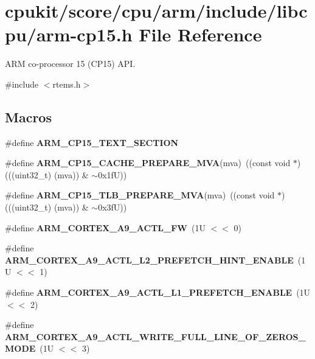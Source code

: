 \hypertarget{arm-cp15_8h}{}\section{cpukit/score/cpu/arm/include/libcpu/arm-\/cp15.h File Reference}
\label{arm-cp15_8h}


A\+RM co-\/processor 15 (C\+P15) A\+PI.  


{\ttfamily \#include $<$rtems.\+h$>$}\newline
\subsection*{Macros}
\begin{DoxyCompactItemize}
\item 
\mbox{\label{arm-cp15_8h_a0c4c710cc0f6b1bfbdc26505bc53a447}} 
\#define {\bfseries A\+R\+M\+\_\+\+C\+P15\+\_\+\+T\+E\+X\+T\+\_\+\+S\+E\+C\+T\+I\+ON}
\item 
\mbox{\label{arm-cp15_8h_ab15a778a34f0fd55e4ed88f792a86b35}} 
\#define {\bfseries A\+R\+M\+\_\+\+C\+P15\+\_\+\+C\+A\+C\+H\+E\+\_\+\+P\+R\+E\+P\+A\+R\+E\+\_\+\+M\+VA}(mva)~((const void $\ast$) (((uint32\+\_\+t) (mva)) \& $\sim$0x1f\+U))
\item 
\mbox{\label{arm-cp15_8h_aefc5be3f674b2fa5b636a62ad2952a64}} 
\#define {\bfseries A\+R\+M\+\_\+\+C\+P15\+\_\+\+T\+L\+B\+\_\+\+P\+R\+E\+P\+A\+R\+E\+\_\+\+M\+VA}(mva)~((const void $\ast$) (((uint32\+\_\+t) (mva)) \& $\sim$0x3f\+U))
\item 
\#define {\bfseries A\+R\+M\+\_\+\+C\+O\+R\+T\+E\+X\+\_\+\+A9\+\_\+\+A\+C\+T\+L\+\_\+\+FW}~(1\+U $<$$<$ 0)
\item 
\#define {\bfseries A\+R\+M\+\_\+\+C\+O\+R\+T\+E\+X\+\_\+\+A9\+\_\+\+A\+C\+T\+L\+\_\+\+L2\+\_\+\+P\+R\+E\+F\+E\+T\+C\+H\+\_\+\+H\+I\+N\+T\+\_\+\+E\+N\+A\+B\+LE}~(1\+U $<$$<$ 1)
\item 
\#define {\bfseries A\+R\+M\+\_\+\+C\+O\+R\+T\+E\+X\+\_\+\+A9\+\_\+\+A\+C\+T\+L\+\_\+\+L1\+\_\+\+P\+R\+E\+F\+E\+T\+C\+H\+\_\+\+E\+N\+A\+B\+LE}~(1\+U $<$$<$ 2)
\item 
\#define {\bfseries A\+R\+M\+\_\+\+C\+O\+R\+T\+E\+X\+\_\+\+A9\+\_\+\+A\+C\+T\+L\+\_\+\+W\+R\+I\+T\+E\+\_\+\+F\+U\+L\+L\+\_\+\+L\+I\+N\+E\+\_\+\+O\+F\+\_\+\+Z\+E\+R\+O\+S\+\_\+\+M\+O\+DE}~(1\+U $<$$<$ 3)

\end{DoxyCompactItemize}

